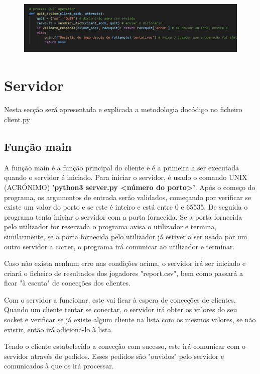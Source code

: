 \documentclass{report}
\begin{document}
\begin{figure}[!h]
\center
\includegraphics[height = 77pt]{img/quit.png}
\end{figure}
\section{Servidor}
\label{sec:server}
Nesta secção será apresentada e explicada a metodologia docódigo no ficheiro client.py

\subsection{Função main}
\label{ssec:func_main}

A função main é a função principal do cliente e é a primeira a ser executada quando o servidor é iniciado. Para iniciar o servidor, é usado o comando UNIX (ACRÓNIMO) \textbf{'python3 server.py <número do porto>'}. Após o começo do programa, os argumentos de entrada serão validados, começando por verificar se existe um valor do porto e se este é inteiro e está entre 0 e 65535. De seguida o programa tenta iniciar o servidor com a porta fornecida. Se a porta fornecida pelo utilizador for reservada o programa avisa o utilizador e termina, similarmente, se a porta fornecida pelo utilizador já estiver a ser usada por um outro servidor a correr, o programa irá comunicar ao utilizador e terminar. 

Caso não exista nenhum erro nas condições acima, o servidor irá ser iniciado e criará o ficheiro de resultados dos jogadores "report.csv", bem como passará a ficar "à escuta" de conecções dos clientes.

Com o servidor a funcionar, este vai ficar à espera de conecções de clientes. Quando um cliente tentar se conectar, o servidor irá obter os valores do seu socket e verificar se já existe algum cliente na lista com os mesmos valores, se não existir, então irá adicioná-lo à lista.

Tendo o cliente estabelecido a conecção com sucesso, este irá comunicar com o servidor através de pedidos. Esses pedidos são "ouvidos" pelo servidor e comunicados à  que os irá processar.
\end{document}

